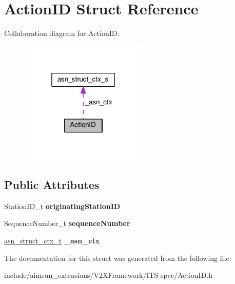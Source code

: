 \hypertarget{structActionID}{}\section{Action\+ID Struct Reference}
\label{structActionID}


Collaboration diagram for Action\+ID\+:\nopagebreak
\begin{figure}[H]
\begin{center}
\leavevmode
\includegraphics[width=172pt]{structActionID__coll__graph}
\end{center}
\end{figure}
\subsection*{Public Attributes}
\begin{DoxyCompactItemize}
\item 
Station\+I\+D\+\_\+t {\bfseries originating\+Station\+ID}\hypertarget{structActionID_a29ecab1361223b12ff09aaebdc54a42e}{}\label{structActionID_a29ecab1361223b12ff09aaebdc54a42e}

\item 
Sequence\+Number\+\_\+t {\bfseries sequence\+Number}\hypertarget{structActionID_a919dcd18229695bde2389d910c3d6aa3}{}\label{structActionID_a919dcd18229695bde2389d910c3d6aa3}

\item 
\hyperlink{structasn__struct__ctx__s}{asn\+\_\+struct\+\_\+ctx\+\_\+t} {\bfseries \+\_\+asn\+\_\+ctx}\hypertarget{structActionID_aae2526cb3cb1e7fa83c19e6d2a4ac321}{}\label{structActionID_aae2526cb3cb1e7fa83c19e6d2a4ac321}

\end{DoxyCompactItemize}


The documentation for this struct was generated from the following file\+:\begin{DoxyCompactItemize}
\item 
include/aimsun\+\_\+extensions/\+V2\+X\+Framework/\+I\+T\+S-\/spec/Action\+I\+D.\+h\end{DoxyCompactItemize}
